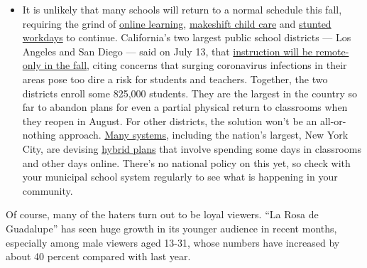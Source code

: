 \begin{itemize}
  \begin{itemize}
  \tightlist
  \item
    It is unlikely that many schools will return to a normal schedule
    this fall, requiring the grind of
    \href{https://www.nytimes.com/2020/06/05/us/coronavirus-education-lost-learning.html?action=click\&pgtype=Article\&state=default\&region=MAIN_CONTENT_3\&context=storylines_faq}{online
    learning},
    \href{https://www.nytimes.com/2020/05/29/us/coronavirus-child-care-centers.html?action=click\&pgtype=Article\&state=default\&region=MAIN_CONTENT_3\&context=storylines_faq}{makeshift
    child care} and
    \href{https://www.nytimes.com/2020/06/03/business/economy/coronavirus-working-women.html?action=click\&pgtype=Article\&state=default\&region=MAIN_CONTENT_3\&context=storylines_faq}{stunted
    workdays} to continue. California's two largest public school
    districts --- Los Angeles and San Diego --- said on July 13, that
    \href{https://www.nytimes.com/2020/07/13/us/lausd-san-diego-school-reopening.html?action=click\&pgtype=Article\&state=default\&region=MAIN_CONTENT_3\&context=storylines_faq}{instruction
    will be remote-only in the fall}, citing concerns that surging
    coronavirus infections in their areas pose too dire a risk for
    students and teachers. Together, the two districts enroll some
    825,000 students. They are the largest in the country so far to
    abandon plans for even a partial physical return to classrooms when
    they reopen in August. For other districts, the solution won't be an
    all-or-nothing approach.
    \href{https://bioethics.jhu.edu/research-and-outreach/projects/eschool-initiative/school-policy-tracker/}{Many
    systems}, including the nation's largest, New York City, are
    devising
    \href{https://www.nytimes.com/2020/06/26/us/coronavirus-schools-reopen-fall.html?action=click\&pgtype=Article\&state=default\&region=MAIN_CONTENT_3\&context=storylines_faq}{hybrid
    plans} that involve spending some days in classrooms and other days
    online. There's no national policy on this yet, so check with your
    municipal school system regularly to see what is happening in your
    community.
  \end{itemize}
\end{itemize}

Of course, many of the haters turn out to be loyal viewers. ``La Rosa de
Guadalupe'' has seen huge growth in its younger audience in recent
months, especially among male viewers aged 13-31, whose numbers have
increased by about 40 percent compared with last year.

